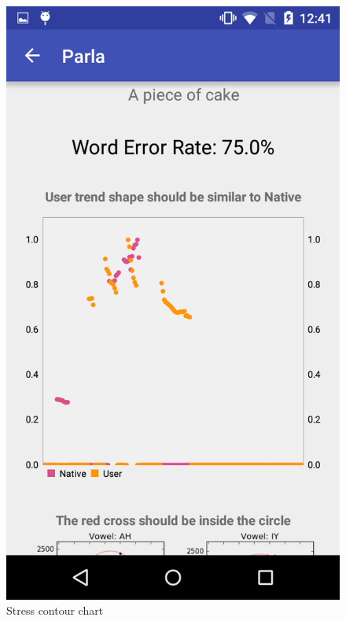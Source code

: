 \begin{figure}[!ht]
	\centering
	\begin{minipage}{.5\textwidth}
		\centering
		\includegraphics[scale=0.18]{Figures/screenshots/pitch.png}
		\caption{Stress contour chart}
		\label{fig:pitch_page}
	\end{minipage}%
	\begin{minipage}{.5\textwidth}
		\centering

\end{minipage}
\end{figure}

